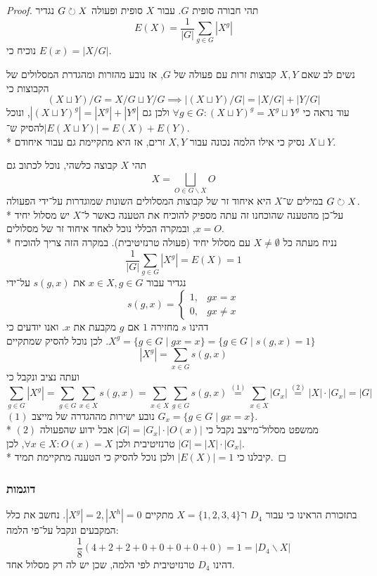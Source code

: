 \begin{proof}
	תהי חבורה סופית $G$. עבור $X$ סופית ופעולה $G \circlearrowright X$ נגדיר
	\[
		E(X) = \frac{1}{|G|} \sum_{g \in G} |X^g|
	\]
	נוכיח כי $E(x) = |X/G|$.

	נשים לב שאם $X, Y$ קבוצות זרות עם פעולה של $G$, אז נובע מהזרות ומהגדרת המסלולים של הקבוצות כי
	\[
		(X \sqcup Y)/G = X/G \sqcup Y/G
		\implies
		|(X \sqcup Y)/G| = |X/G| + |Y/G|
	\]
	עוד נראה כי	$\forall g \in G : {(X \sqcup Y)}^g = X^g \sqcup Y^g$
	ולכן גם $|{(X \sqcup Y)}^g| = |X^g| + |Y^g|$,
	ונוכל להסיק ש־$|E(X \sqcup Y)| = E(X) + E(Y)$. \\*
	נסיק כי אילו הלמה נכונה עבור $X, Y$ זרים, אז היא מתקיימת גם עבור איחודם $X \sqcup Y$.

	תהי $X$ קבוצה כלשהי, נוכל לכתוב גם
	\[
		X = \bigsqcup_{O \in G\backslash X} O
	\]
	במילים ש־$X$ היא איחוד זר של קבוצות המסלולים השונות שמוגדרות על־ידי הפעולה $G \circlearrowright X$. \\*
	על־כן מהטענה שהוכחנו זה עתה מספיק להוכיח את הטענה כאשר ל־$X$ יש מסלול יחיד $x = O$, ובמקרה הכללי נוכל לאחד איחוד זר של מסלולים. \\*
	נניח מעתה כל $X \ne \emptyset$ עם מסלול יחיד (פעולה טרנזיטיבית).
	במקרה הזה צריך להוכיח
	\[
		\frac{1}{|G|} \sum_{g \in G} |X^g| = E(X) = 1
	\]
	נגדיר עבור $x \in X, g \in G$ את $s(g, x)$ על־ידי
	\[
		s(g, x) = \begin{cases}
			1, & gx = x \\
			0, & gx \ne x
		\end{cases}
	\]
	דהינו $s$ מחזירה $1$ אם $g$ מקבעת את $x$. ואנו יודעים כי $X^g = \{ g \in G \mid gx = x \} = \{ g \in G \mid s(g, x) = 1 \}$.
	לכן נוכל להסיק שמתקיים
	\[
		|X^g| = \sum_{x \in G} s(g, x)
	\]
	ועתה נציב ונקבל כי
	\[
		\sum_{g \in G} |X^g|
		= \sum_{g \in G} \sum_{x \in X} s(g, x)
		= \sum_{x \in X} \sum_{g \in G}  s(g, x)
		\overset{(1)}{=} \sum_{x \in X} |G_x|
		\overset{(2)}{=} |X| \cdot |G_x| = |G|
	\]
	$(1)$ נובע ישירות מההגדרה של מייצב $G_x = \{ g \in G \mid g x = x\}$. \\*
	$(2)$ ממשפט מסלול־מייצב נקבל כי $|G| = |G_x| \cdot |O(x)|$ אבל ידוע שהפעולה טרנזיטיבית ולכן $\forall x \in X: O(x) = X$, לכן $|G| = |X| \cdot |G_x|$. \\*
	קיבלנו כי $|E(X)| = 1$ ולכן נוכל להסיק כי הטענה מתקיימת תמיד.
\end{proof}

\subsubsection{דוגמות}
בתזכורת הראינו כי עבור $D_4$ ו־$X = \{1, 2, 3, 4\}$ מתקיים $|X^g| = 2, |X^h| = 0$.
נחשב את כלל המקבעים ונקבל על־פי הלמה:
\[
	\frac{1}{8} (4 + 2 + 2 + 0 + 0 + 0 + 0 + 0) = 1 = |D_4 \backslash X|
\]
דהינו $D_4$ טרנזיטיבית לפי הלמה, שכן יש לה רק מסלול אחד.

